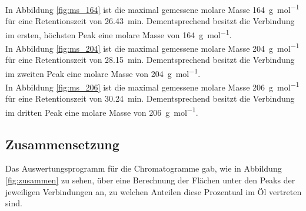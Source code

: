 
In Abbildung \ref{fig:ms_164} ist die maximal gemessene molare Masse \SI{164}{\gram \per \mole} für eine Retentionszeit von \SI{26,43}{\minute}. Dementsprechend besitzt die Verbindung im ersten, höchsten Peak eine molare Masse von \SI{164}{\gram \per \mole}.\\
\newpage
In Abbildung \ref{fig:ms_204} ist die maximal gemessene molare Masse \SI{204}{\gram \per \mole} für eine Retentionszeit von \SI{28,15}{\minute}. Dementsprechend besitzt die Verbindung im zweiten Peak eine molare Masse von \SI{204}{\gram \per \mole}.\\
In Abbildung \ref{fig:ms_206} ist die maximal gemessene molare Masse \SI{206}{\gram \per \mole} für eine Retentionszeit von \SI{30,24}{\minute}. Dementsprechend besitzt die Verbindung im dritten Peak eine molare Masse von \SI{206}{\gram \per \mole}.

\subsection*{Zusammensetzung}
Das Auswertungsprogramm für die Chromatogramme gab, wie in Abbildung \ref{fig:zusammen} zu sehen, über eine Berechnung der Flächen unter den Peaks der jeweiligen Verbindungen an, zu welchen Anteilen diese Prozentual im Öl vertreten sind.



